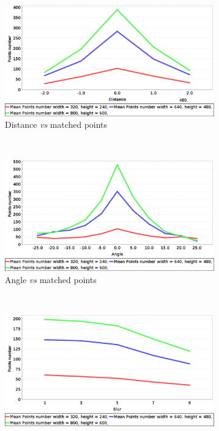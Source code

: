 \begin{figure}[t]
        \centering
        \begin{subfigure}[b]{0.45\textwidth}
	    \includegraphics[width=\textwidth]{distVsMatches}
	  \caption{Distance \emph{vs} matched points}\label{fig:cp01_distance_vs_matched}
        \end{subfigure}%
        ~
        \begin{subfigure}[b]{0.45\textwidth}
	    \includegraphics[width=\textwidth]{angleVsMatches}
	  \caption{Angle \emph{vs} matched points}\label{fig:cp01_angle_vs_matched}
        \end{subfigure}%
        \\
        \begin{subfigure}[b]{0.45\textwidth}
	    \includegraphics[width=\textwidth]{blurVsMatches}

\end{subfigure}
\end{figure}
